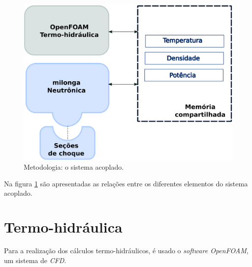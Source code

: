 \begin{figure}[h]
  \centering\includegraphics[scale=0.7]{figuras/metodologia1.png}
  \caption{Metodologia: o sistema acoplado.}
  \label{metodoetapas}
\end{figure}

Na figura \ref{metodoetapas} são apresentadas as relações entre os diferentes elementos
do sistema acoplado.



\section{Termo-hidráulica}
\label{sec:th}

Para a realização dos cálculos termo-hidráulicos, é usado o \textit{software OpenFOAM},
um sistema de \textit{CFD}.
